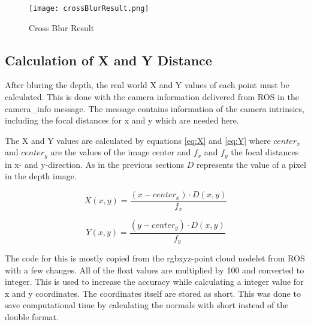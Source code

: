 \begin{figure}[H]
\begin{center}
  \texttt{[image: crossBlurResult.png]}
  \caption{Cross Blur Result}
  \label{figure:crossblurResult}
\end{center}
\end{figure} 


\subsection{Calculation of X and Y Distance}
After bluring the depth, the real world X and Y values of each point must be calculated. 
This is done with the camera information delivered from ROS in the camera\_info message.
The message contains information of the camera intrinsics, including the focal 
distances for x and y which are needed here.

The X and Y values are calculated by equations \vref{eq:X} and \vref{eq:Y} where $center_x$ and $center_y$ are
the values of the image center and $f_x$ and $f_y$ the focal distances in x- and y-direction. As in the
previous sections $D$ represents the value of a pixel in the depth image.

\begin{equation}
X(x,y)=\frac{(x-center_x) \cdot D(x,y)}{f_x}
\label{eq:X}
\end{equation}

\begin{equation}
Y(x,y)=\frac{(y-center_y) \cdot D(x,y)}{f_y}
\label{eq:Y}
\end{equation}

The code for this is mostly copied from the rgbxyz-point cloud nodelet from ROS with a few changes.
All of the float values are multiplied by 100 and converted to integer. This is used to increase the accuracy while
calculating a integer value for x and y coordinates. The coordinates itself are stored as short. This was done to save
computational time by calculating the normals with short instead of the double format.

